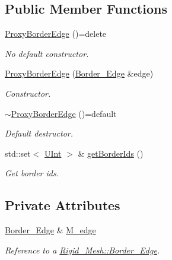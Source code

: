 \subsection*{Public Member Functions}
\begin{DoxyCompactItemize}
\item 
\hyperlink{classFVCode3D_1_1ProxyBorderEdge_a836c50ed3f113ae15e06091906c5d98e}{Proxy\+Border\+Edge} ()=delete
\begin{DoxyCompactList}\small\item\em No default constructor. \end{DoxyCompactList}\item 
\hyperlink{classFVCode3D_1_1ProxyBorderEdge_a5bf60218b1fc235e91b9d806a6ed57c0}{Proxy\+Border\+Edge} (\hyperlink{classFVCode3D_1_1ProxyBorderEdge_a176560e18e23c914702256b4921d9c9c}{Border\+\_\+\+Edge} \&edge)
\begin{DoxyCompactList}\small\item\em Constructor. \end{DoxyCompactList}\item 
\hyperlink{classFVCode3D_1_1ProxyBorderEdge_afc2f7db0791cd1466f08766c88be2b72}{$\sim$\+Proxy\+Border\+Edge} ()=default
\begin{DoxyCompactList}\small\item\em Default destructor. \end{DoxyCompactList}\item 
std\+::set$<$ \hyperlink{namespaceFVCode3D_a4bf7e328c75d0fd504050d040ebe9eda}{U\+Int} $>$ \& \hyperlink{classFVCode3D_1_1ProxyBorderEdge_a420dab713ecfee4145b45a08d2ad6a11}{get\+Border\+Ids} ()
\begin{DoxyCompactList}\small\item\em Get border ids. \end{DoxyCompactList}\end{DoxyCompactItemize}
\subsection*{Private Attributes}
\begin{DoxyCompactItemize}
\item 
\hyperlink{classFVCode3D_1_1ProxyBorderEdge_a176560e18e23c914702256b4921d9c9c}{Border\+\_\+\+Edge} \& \hyperlink{classFVCode3D_1_1ProxyBorderEdge_ad4337ca6acca8e9535e61f899f2fe3f6}{M\+\_\+edge}
\begin{DoxyCompactList}\small\item\em Reference to a \hyperlink{classFVCode3D_1_1Rigid__Mesh_1_1Border__Edge}{Rigid\+\_\+\+Mesh\+::\+Border\+\_\+\+Edge}. \end{DoxyCompactList}\end{DoxyCompactItemize}


